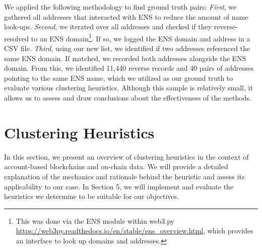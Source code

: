 \documentclass[12pt,a4paper,titlepage,oneside,english]{article}
\begin{document}
We applied the following methodology to find ground truth pairs: \textit{First}, we gathered all addresses that interacted with ENS to reduce the amount of name look-ups. \textit{Second}, we iterated over all addresses and checked if they reverse-resolved to an ENS domain\footnote{This was done via the ENS module within web3.py \url{https://web3py.readthedocs.io/en/stable/ens_overview.html}, which provides an interface to look up domains and addresses.}. If so, we logged the ENS domain and address in a CSV file. \textit{Third}, using our new list, we identified if two addresses referenced the same ENS domain. If matched, we recorded both addresses alongside the ENS domain. \newline
From this, we identified 11,440 reverse records and 40 pairs of addresses pointing to the same ENS name, which we utilized as our ground truth to evaluate various clustering heuristics. Although this sample is relatively small, it allows us to assess and draw conclusions about the effectiveness of the methods.



\section{Clustering Heuristics}
In this section, we present an overview of clustering heuristics in the context of account-based blockchains and on-chain data. We will provide a detailed explanation of the mechanics and rationale behind the heuristic and assess its applicability to our case. 
In Section 5, we will implement and evaluate the heuristics we determine to be suitable for our objectives.
\end{document}
